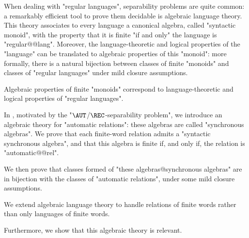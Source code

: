 When dealing with "regular languages",
separability problems are quite common: a remarkably efficient tool
to prove them decidable is algebraic language theory.
This theory associates to every language a canonical algebra, called "syntactic monoid",
with the property that it is finite "if and only" the language is "regular@@lang".
Moreover, the language-theoretic and logical properties of the "language" can be
translated to algebraic properties of this "monoid": more formally, there is a natural
bijection between classes of finite "monoids" and classes of
"regular languages" under mild closure assumptions.

\begin{known}
	Algebraic properties of finite "monoids" correspond to
	language-theoretic and logical properties of "regular languages".
\end{known}

In , motivated by the "$\AUT$/$\REC$-separability problem",
we introduce an algebraic theory for "automatic relations": these algebras are called
"synchronous algebras".
We prove that each finite-word relation admits a "syntactic synchronous algebra",
and that this algebra is finite if, and only if, the relation is "automatic@@rel".

We then prove that classes formed of "these algebras@synchronous algebras" 
are in bijection with the classes of "automatic relations", under some mild closure
assumptions. 

\begin{contribution}
	We extend algebraic language theory to handle relations of finite words
	rather than only languages of finite words.
\end{contribution}

Furthermore, we show that this algebraic theory is relevant.
